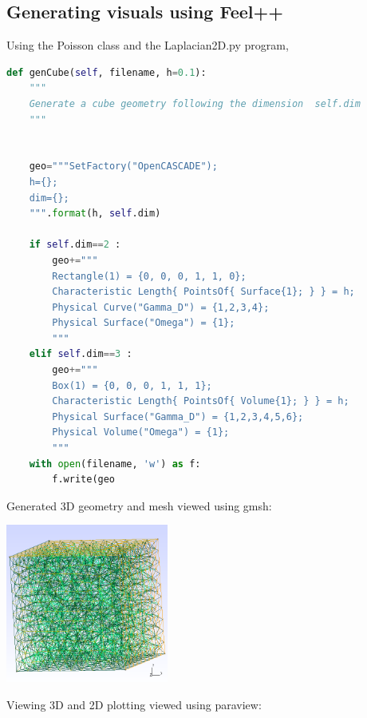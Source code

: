 \documentclass[12pt]{article}
\begin{document}
\begin{enumerate}
\subsection{Generating visuals using Feel++}

Using the Poisson class and the Laplacian2D.py program,


\begin{lstlisting}[language=Python,caption={},frame=single, backgroundcolor=\color{gray!10}, basicstyle=\footnotesize,rulecolor=\color{blue}, framexleftmargin=3pt, commentstyle=\color{mygreen}, keywordstyle=\color{blue}]
def genCube(self, filename, h=0.1):
    """
    Generate a cube geometry following the dimension  self.dim
    """

    
    geo="""SetFactory("OpenCASCADE");
    h={};
    dim={};
    """.format(h, self.dim)
    
    if self.dim==2 :
        geo+="""
        Rectangle(1) = {0, 0, 0, 1, 1, 0};
        Characteristic Length{ PointsOf{ Surface{1}; } } = h;
        Physical Curve("Gamma_D") = {1,2,3,4};
        Physical Surface("Omega") = {1};
        """
    elif self.dim==3 :
        geo+="""
        Box(1) = {0, 0, 0, 1, 1, 1};
        Characteristic Length{ PointsOf{ Volume{1}; } } = h;
        Physical Surface("Gamma_D") = {1,2,3,4,5,6};
        Physical Volume("Omega") = {1};
        """
    with open(filename, 'w') as f:
        f.write(geo
\end{lstlisting}

Generated 3D geometry and mesh viewed using gmsh:

\begin{frame}{}
        \includegraphics[width=0.4\textwidth]{images/fppmsh.png}
\end{frame}


Viewing 3D and 2D plotting viewed using paraview:


\end{enumerate}
\end{document}
